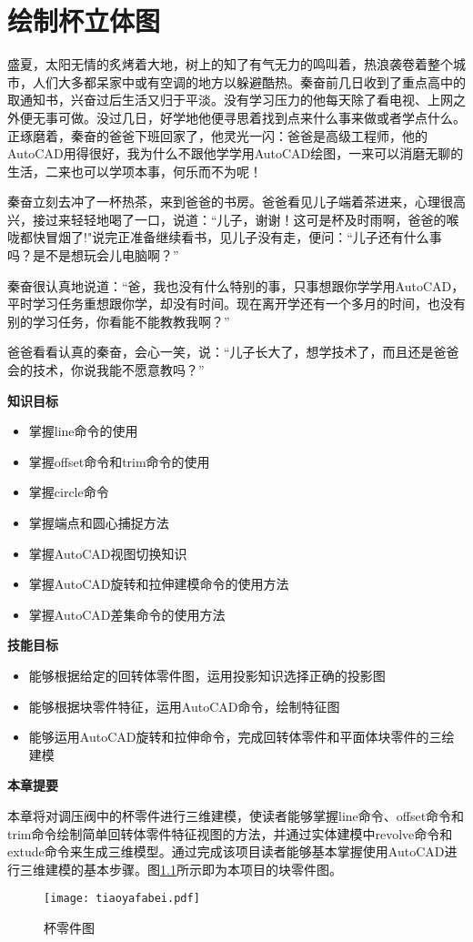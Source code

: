\chapter{绘制杯立体图}\label{chap:bei}

盛夏，太阳无情的炙烤着大地，树上的知了有气无力的鸣叫着，热浪袭卷着整个城市，人们大多都呆家中或有空调的地方以躲避酷热。秦奋前几日收到了重点高中的取通知书，兴奋过后生活又归于平淡。没有学习压力的他每天除了看电视、上网之外便无事可做。没过几日，好学地他便寻思着找到点来什么事来做或者学点什么。正琢磨着，秦奋的爸爸下班回家了，他灵光一闪：爸爸是高级工程师，他的AutoCAD用得很好，我为什么不跟他学学用AutoCAD绘图，一来可以消磨无聊的生活，二来也可以学项本事，何乐而不为呢！

秦奋立刻去冲了一杯热茶，来到爸爸的书房。爸爸看见儿子端着茶进来，心理很高兴，接过来轻轻地喝了一口，说道：“儿子，谢谢！这可是杯及时雨啊，爸爸的喉咙都快冒烟了!"说完正准备继续看书，见儿子没有走，便问：“儿子还有什么事吗？是不是想玩会儿电脑啊？”

秦奋很认真地说道：“爸，我也没有什么特别的事，只事想跟你学学用AutoCAD，平时学习任务重想跟你学，却没有时间。现在离开学还有一个多月的时间，也没有别的学习任务，你看能不能教教我啊？”

爸爸看看认真的秦奋，会心一笑，说：“儿子长大了，想学技术了，而且还是爸爸会的技术，你说我能不愿意教吗？”

{\bfseries 知识目标}
\begin{itemize}
\item 掌握line命令的使用
\item 掌握offset命令和trim命令的使用
\item 掌握circle命令
\item 掌握端点和圆心捕捉方法
\item 掌握AutoCAD视图切换知识
\item 掌握AutoCAD旋转和拉伸建模命令的使用方法
\item 掌握AutoCAD差集命令的使用方法
\end{itemize}

{\bfseries 技能目标}
\begin{itemize}
\item 能够根据给定的回转体零件图，运用投影知识选择正确的投影图
\item 能够根据块零件特征，运用AutoCAD命令，绘制特征图
\item 能够运用AutoCAD旋转和拉伸命令，完成回转体零件和平面体块零件的三绘建模
\end{itemize}

{\bfseries 本章提要}

本章将对调压阀中的杯零件进行三维建模，使读者能够掌握line命令、offset命令和trim命令绘制简单回转体零件特征视图的方法，并通过实体建模中revolve命令和extude命令来生成三维模型。通过完成该项目读者能够基本掌握使用AutoCAD进行三维建模的基本步骤。图\ref{fig:tiaoyafabei}所示即为本项目的块零件图。
\noindent
\begin{figure}[htbp]
\centering
\texttt{[image: tiaoyafabei.pdf]}
\caption{杯零件图}\label{fig:tiaoyafabei}
\end{figure}
\endinput